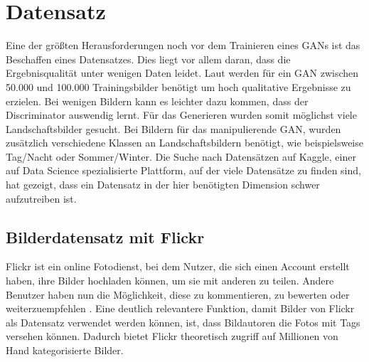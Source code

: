 \chapter{Datensatz}\label{chp:datensatz} %
\glsresetall
Eine der größten Herausforderungen noch vor dem Trainieren eines GANs ist das
Beschaffen eines Datensatzes.  Dies liegt vor allem daran, dass die
Ergebnisqualität unter wenigen Daten leidet. Laut
 \cite{noauthor_nvidia_2020} werden für ein GAN
zwischen 50.000 und 100.000 Trainingsbilder benötigt um hoch qualitative
Ergebnisse zu erzielen. Bei wenigen Bildern kann es leichter dazu kommen, dass
der Discriminator auswendig lernt. Für das Generieren wurden somit möglichst
viele Landschaftsbilder gesucht. Bei Bildern für das manipulierende GAN, wurden
zusätzlich verschiedene Klassen an Landschaftsbildern  benötigt, wie
beispielsweise Tag/Nacht oder Sommer/Winter. Die Suche nach Datensätzen auf
Kaggle, einer auf Data Science spezialisierte Plattform, auf der viele
Datensätze zu finden sind, hat gezeigt, dass ein Datensatz in der hier
benötigten Dimension schwer aufzutreiben ist.

\section{Bilderdatensatz mit Flickr} %
Flickr ist ein online Fotodienst, bei dem Nutzer, die sich einen Account
erstellt haben, ihre Bilder hochladen können, um sie mit anderen zu teilen.
Andere Benutzer haben nun die Möglichkeit, diese zu kommentieren, zu bewerten
oder weiterzuempfehlen \cite{noauthor_was_nodate}. Eine deutlich relevantere
Funktion, damit Bilder von Flickr als Datensatz verwendet werden können, ist,
dass Bildautoren die Fotos mit Tags versehen können. Dadurch bietet Flickr
theoretisch zugriff auf Millionen von Hand kategorisierte Bilder. 

